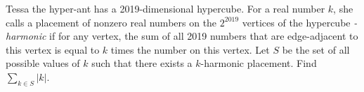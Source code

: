 Tessa the hyper-ant has a 2019-dimensional hypercube. For a real number $k$, she calls a placement of nonzero real numbers on the $2^{2019}$ vertices of the hypercube \textit{-harmonic} if for any vertex, the sum of all 2019 numbers that are edge-adjacent to this vertex is equal to $k$ times the number on this vertex. Let $S$ be the set of all possible values of $k$ such that there exists a $k$-harmonic placement. Find $\sum_{k \in S} |k|$.